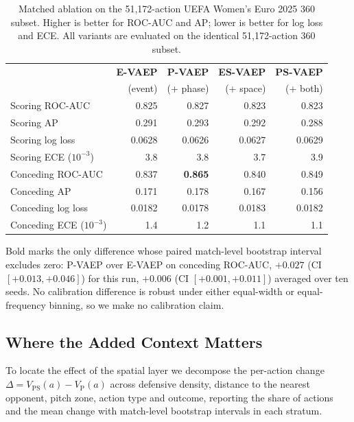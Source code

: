 \documentclass[runningheads]{llncs}
\begin{document}
\begin{table}[!tbph]
\footnotesize
\centering
\caption{Matched ablation on the 51,172-action UEFA Women's Euro 2025 360 subset. Higher is better for ROC-AUC and AP; lower is better for log loss and ECE. All variants are evaluated on the identical 51{,}172-action 360 subset.}
\label{tab:ablation}
\begin{tabular}{lrrrr}
\toprule
& \textbf{E-VAEP} & \textbf{P-VAEP} & \textbf{ES-VAEP} & \textbf{PS-VAEP} \\
& (event) & (+ phase) & (+ space) & (+ both) \\
\midrule
Scoring ROC-AUC & 0.825 & 0.827 & 0.823 & 0.823 \\
Scoring AP & 0.291 & 0.293 & 0.292 & 0.288 \\
Scoring log loss & 0.0628 & 0.0626 & 0.0627 & 0.0629 \\
Scoring ECE ($10^{-3}$) & 3.8 & 3.8 & 3.7 & 3.9 \\
\midrule
Conceding ROC-AUC & 0.837 & \textbf{0.865} & 0.840 & 0.849 \\
Conceding AP & 0.171 & 0.178 & 0.167 & 0.156 \\
Conceding log loss & 0.0182 & 0.0178 & 0.0183 & 0.0182 \\
Conceding ECE ($10^{-3}$) & 1.4 & 1.2 & 1.1 & 1.1 \\
\bottomrule
\end{tabular}

\vspace{0.5em}
{\footnotesize
Bold marks the only difference whose paired match-level bootstrap interval excludes zero: P-VAEP over E-VAEP on conceding ROC-AUC, $+0.027$ (CI $[+0.013, +0.046]$) for this run, $+0.006$ (CI $[+0.001, +0.011]$) averaged over ten seeds. No calibration difference is robust under either equal-width or equal-frequency binning, so we make no calibration claim.
}
\end{table}

\subsection{Where the Added Context Matters}
\label{sec:where}

To locate the effect of the spatial layer we decompose the per-action change $\Delta = V_{\mathrm{PS}}(a) - V_{\mathrm{P}}(a)$ across defensive density, distance to the nearest opponent, pitch zone, action type and outcome, reporting the share of actions and the mean change with match-level bootstrap intervals in each stratum.
\end{document}
